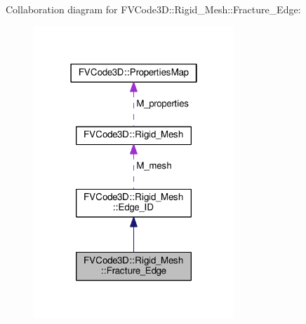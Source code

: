 Collaboration diagram for F\+V\+Code3D\+:\+:Rigid\+\_\+\+Mesh\+:\+:Fracture\+\_\+\+Edge\+:
\nopagebreak
\begin{figure}[H]
\begin{center}
\leavevmode
\includegraphics[width=214pt]{classFVCode3D_1_1Rigid__Mesh_1_1Fracture__Edge__coll__graph}
\end{center}
\end{figure}
